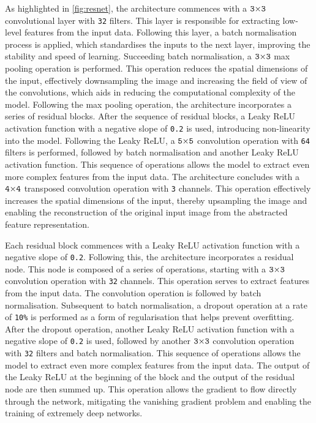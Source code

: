 As highlighted in \autoref{fig:resnet}, the architecture commences with a $\text{\texttt{3}} {\times} \text{\texttt{3}}$ convolutional layer with \texttt{32} filters. This layer is responsible for extracting low-level features from the input data. Following this layer, a batch normalisation process is applied, which standardises the inputs to the next layer, improving the stability and speed of learning. Succeeding batch normalisation, a $\text{\texttt{3}} {\times} \text{\texttt{3}}$ max pooling operation is performed. This operation reduces the spatial dimensions of the input, effectively downsampling the image and increasing the field of view of the convolutions, which aids in reducing the computational complexity of the model. Following the max pooling operation, the architecture incorporates a series of residual blocks. After the sequence of residual blocks, a Leaky ReLU activation function with a negative slope of \texttt{0.2} is used, introducing non-linearity into the model. Following the Leaky ReLU, a $\text{\texttt{5}} {\times} \text{\texttt{5}}$ convolution operation with \texttt{64} filters is performed, followed by batch normalisation and another Leaky ReLU activation function. This sequence of operations allows the model to extract even more complex features from the input data. The architecture concludes with a $\text{\texttt{4}} {\times} \text{\texttt{4}}$ transposed convolution operation with \texttt{3} channels. This operation effectively increases the spatial dimensions of the input, thereby upsampling the image and enabling the reconstruction of the original input image from the abstracted feature representation.

Each residual block commences with a Leaky ReLU activation function with a negative slope of \texttt{0.2}. Following this, the architecture incorporates a residual node. This node is composed of a series of operations, starting with a $\text{\texttt{3}} {\times} \text{\texttt{3}}$ convolution operation with \texttt{32} channels. This operation serves to extract features from the input data. The convolution operation is followed by batch normalisation. Subsequent to batch normalisation, a dropout operation at a rate of \texttt{10\%} is performed as a form of regularisation that helps prevent overfitting. After the dropout operation, another Leaky ReLU activation function with a negative slope of \texttt{0.2} is used, followed by another $\text{\texttt{3}} {\times} \text{\texttt{3}}$ convolution operation with \texttt{32} filters and batch normalisation. This sequence of operations allows the model to extract even more complex features from the input data. The output of the Leaky ReLU at the beginning of the block and the output of the residual node are then summed up. This operation allows the gradient to flow directly through the network, mitigating the vanishing gradient problem and enabling the training of extremely deep networks.

